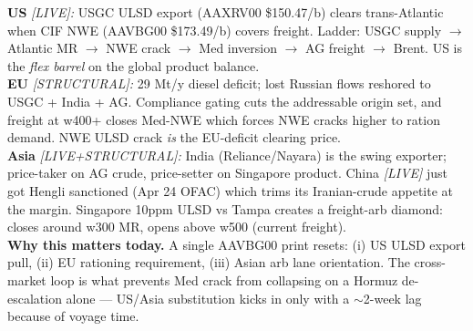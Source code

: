 \documentclass[10pt,a4paper]{article}
\begin{document}
\begin{callout}
\footnotesize
\textbf{US} \emph{[LIVE]:} USGC ULSD export (AAXRV00 \$150.47/b) clears trans-Atlantic when CIF \mbox{NWE} (AAVBG00 \$173.49/b) covers freight. Ladder: USGC supply $\rightarrow$ Atlantic MR $\rightarrow$ \mbox{NWE} crack $\rightarrow$ Med inversion $\rightarrow$ AG freight $\rightarrow$ Brent. US is the \emph{flex barrel} on the global product balance.\\[2pt]
\textbf{EU} \emph{[STRUCTURAL]:} 29 Mt/y diesel deficit; lost Russian flows reshored to USGC + India + AG. Compliance gating cuts the addressable origin set, and freight at w400+ closes Med-NWE which forces \mbox{NWE} cracks higher to ration demand. \mbox{NWE} ULSD crack \emph{is} the EU-deficit clearing price.\\[2pt]
\textbf{Asia} \emph{[LIVE+STRUCTURAL]:} India (Reliance/Nayara) is the swing exporter; price-taker on AG crude, price-setter on Singapore product. China \emph{[LIVE]} just got Hengli sanctioned (Apr 24 OFAC) which trims its Iranian-crude appetite at the margin. Singapore 10ppm ULSD vs Tampa creates a freight-arb diamond: closes around w300 MR, opens above w500 (current freight).\\[2pt]
\textbf{Why this matters today.} A single AAVBG00 print resets: (i) US ULSD export pull, (ii) EU rationing requirement, (iii) Asian arb lane orientation. The cross-market loop is what prevents Med crack from collapsing on a Hormuz de-escalation alone --- US/Asia substitution kicks in only with a $\sim$2-week lag because of voyage time.
\end{callout}

\newpage
\end{document}
